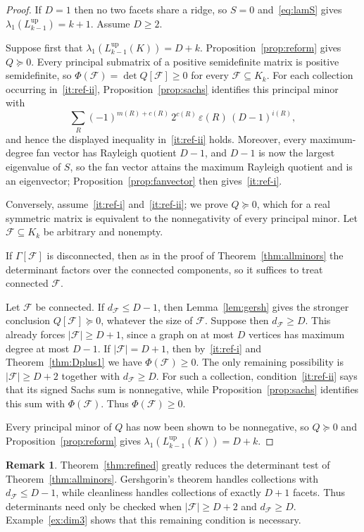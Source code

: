 \documentclass[11pt,reqno]{amsart}
\numberwithin{equation}{section}
\theoremstyle{plain}
\theoremstyle{definition}
\newtheorem{remark}[theorem]{Remark}
\newcommand{\Lup}{L^{\mathrm{up}}}
\newcommand{\eps}{\varepsilon}
\newcommand{\Fset}{\mathcal F}
\begin{document}
\begin{proof}
If $D=1$ then no two facets share a ridge, so $S=0$ and~\eqref{eq:lamS} gives
$\lambda_1(\Lup_{k-1})=k+1$. Assume $D\ge2$.

Suppose first that $\lambda_1(\Lup_{k-1}(K))=D+k$. Proposition~\ref{prop:reform} gives
$Q\succeq0$. Every principal submatrix of a positive semidefinite matrix is positive
semidefinite, so $\Phi(\Fset)=\det Q[\Fset]\ge0$ for every $\Fset\subseteq K_k$. For each
collection occurring in~\ref{it:ref-ii}, Proposition~\ref{prop:sachs} identifies this principal
minor with
\[
  \sum_R {(-1)}^{m(R)+c(R)}\,2^{c(R)}\,\eps(R)\,{(D-1)}^{i(R)},
\]
and hence the displayed inequality in~\ref{it:ref-ii} holds. Moreover,
every maximum-degree fan vector has Rayleigh quotient $D-1$, and $D-1$ is now the largest
eigenvalue of $S$, so the fan vector attains the maximum Rayleigh quotient and is an eigenvector;
Proposition~\ref{prop:fanvector} then gives~\ref{it:ref-i}.

Conversely, assume~\ref{it:ref-i} and~\ref{it:ref-ii}; we prove $Q\succeq0$, which for a real
symmetric matrix is equivalent to the nonnegativity of every principal minor. Let
$\Fset\subseteq K_k$ be arbitrary and nonempty.

If $\Gamma[\Fset]$ is disconnected, then as in the proof of Theorem~\ref{thm:allminors} the
determinant factors over the connected components, so it suffices to treat connected $\Fset$.

Let $\Fset$ be connected. If $d_{\Fset}\le D-1$, then Lemma~\ref{lem:gersh} gives the stronger
conclusion $Q[\Fset]\succeq0$, whatever the size of $\Fset$. Suppose then $d_{\Fset}\ge D$. This
already forces $|\Fset|\ge D+1$, since a graph on at most $D$ vertices has maximum degree at most
$D-1$. If $|\Fset|=D+1$, then by~\ref{it:ref-i} and Theorem~\ref{thm:Dplus1} we have
$\Phi(\Fset)\ge0$. The only remaining possibility is $|\Fset|\ge D+2$ together with
$d_{\Fset}\ge D$. For such a collection, condition~\ref{it:ref-ii} says that its signed Sachs
sum is nonnegative, while Proposition~\ref{prop:sachs} identifies this sum with
$\Phi(\Fset)$. Thus $\Phi(\Fset)\ge0$.

Every principal minor of $Q$ has now been shown to be nonnegative, so $Q\succeq0$ and
Proposition~\ref{prop:reform} gives $\lambda_1(\Lup_{k-1}(K))=D+k$.
\end{proof}

\begin{remark}\label{rem:improved}
Theorem~\ref{thm:refined} greatly reduces the determinant test of
Theorem~\ref{thm:allminors}. Gershgorin's theorem handles collections with
$d_{\Fset}\le D-1$, while cleanliness handles collections of exactly $D+1$ facets. Thus
determinants need only be checked when $|\Fset|\ge D+2$ and $d_{\Fset}\ge D$.
Example~\ref{ex:dim3} shows that this remaining condition is necessary.
\end{remark}
\end{document}
